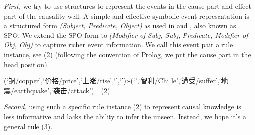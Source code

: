 \textit{First,} we try to use structures to represent the events in the cause part and effect part of the causality well. A simple and effective symbolic event representation is a structured form \textit{(Subject, Predicate, Object)} as used in \cite{Ding} and \cite{Ding2016}, also known as SPO. We extend the SPO form to \textit{(Modifier of Subj, Subj, Predicate, Modifier of Obj, Obj)} to capture richer event information. 
We call this event pair a rule instance, see (2) (following the convention of Prolog, we put the cause part in the head position).

(`铜/copper',`价格/price',`上涨/rise',`',`'):-(`',`智利/Chi le',`遭受/suffer',`地震/earthquake',`袭击/attack')\ \ (2)

\textit{Second,} using such a specific rule instance (2) to represent causal knowledge is less informative and lacks the ability to infer the unseen. Instead, we hope it's a general rule (3).

